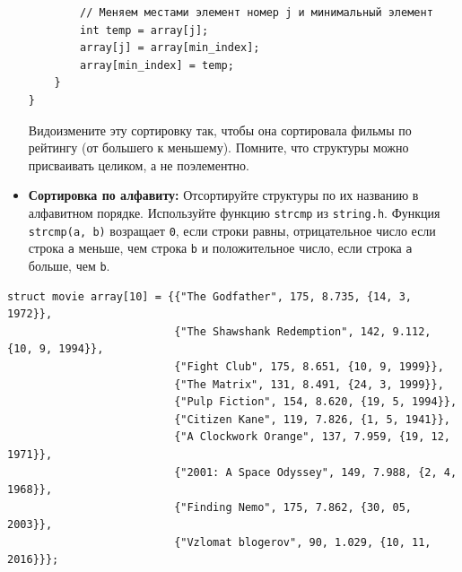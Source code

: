 \documentclass{article}
\begin{document}
\begin{itemize}
\begin{lstlisting}
        // Меняем местами элемент номер j и минимальный элемент
        int temp = array[j];
        array[j] = array[min_index];
        array[min_index] = temp;
    }
}
\end{lstlisting}
Видоизмените эту сортировку так, чтобы она сортировала фильмы по рейтингу (от большего к меньшему). Помните, что структуры можно присваивать целиком, а не поэлементно.
\item \textbf{Сортировка по алфавиту:} Отсортируйте структуры по их названию в алфавитном порядке. Используйте функцию \texttt{strcmp} из \texttt{string.h}. Функция \texttt{strcmp(a, b)} возращает \texttt{0}, если строки равны, отрицательное число если строка \texttt{a} меньше, чем строка \texttt{b} и положительное число, если строка \texttt{a} больше, чем \texttt{b}. 
\end{itemize}

\begin{lstlisting}
struct movie array[10] = {{"The Godfather", 175, 8.735, {14, 3, 1972}},
                          {"The Shawshank Redemption", 142, 9.112, {10, 9, 1994}},
                          {"Fight Club", 175, 8.651, {10, 9, 1999}},
                          {"The Matrix", 131, 8.491, {24, 3, 1999}},
                          {"Pulp Fiction", 154, 8.620, {19, 5, 1994}},
                          {"Citizen Kane", 119, 7.826, {1, 5, 1941}},
                          {"A Clockwork Orange", 137, 7.959, {19, 12, 1971}},
                          {"2001: A Space Odyssey", 149, 7.988, {2, 4, 1968}},
                          {"Finding Nemo", 175, 7.862, {30, 05, 2003}},
                          {"Vzlomat blogerov", 90, 1.029, {10, 11, 2016}}};
\end{lstlisting}

\newpage
\end{document}
